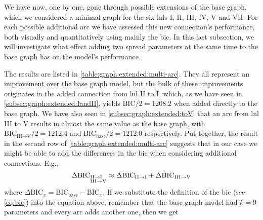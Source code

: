 \documentclass[\relativeRoot/main.tex]{subfiles}
\begin{document}
We have now, one by one, gone through possible extensions of the base graph, which we considered a minimal graph for the six \glspl{lnl} I, II, III, IV, V and VII. For each possible additional arc we have assessed this new connection's performance, both visually and quantitatively using mainly the \acrlong{bic}. In this last subsection, we will investigate what effect adding two spread parameters at the same time to the base graph has on the model's performance.

The results are listed in \cref{table:graph:extended:multi-arc}. They all represent an improvement over the base graph model, but the bulk of these improvements originates in the added connection from \gls{lnl} II to I, which, as we have seen in \cref{subsec:graph:extended:IandII}, yields $\text{BIC}/2 = 1208.2$ when added directly to the base graph. We have also seen in \cref{subsec:graph:extended:toV} that an arc from \gls{lnl} III to V results in almost the same value as the base graph, with $\text{BIC}_{\text{III}\rightarrow\text{V}}/2 = 1212.4$ and $\text{BIC}_\text{base}/2 = 1212.0$ respectively. Put together, the result in the second row of \cref{table:graph:extended:multi-arc} suggests that in our case we might be able to add the differences in the \gls{bic} when considering additional connections. E.g., 
%
\begin{equation}
    \Delta\text{BIC}_{\begin{subarray}{l}\text{II}\rightarrow\text{I} \\ \text{III}\rightarrow\text{V}\end{subarray}} \approx \Delta\text{BIC}_{\text{II}\rightarrow\text{I}} + \Delta\text{BIC}_{\text{III}\rightarrow\text{V}}
\end{equation}
%
where $\Delta\text{BIC}_x = \text{BIC}_\text{base} - \text{BIC}_x$. If we substitute the definition of the \gls{bic} (see \cref{eq:bic}) into the equation above, remember that the base graph model had $k = 9$ parameters and every arc adds another one, then we get
%
\end{document}
